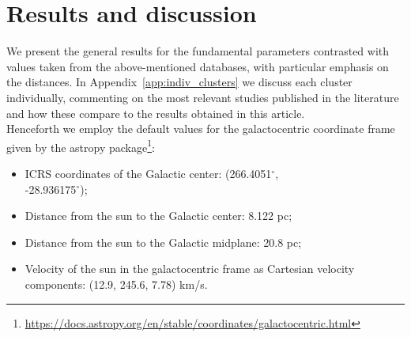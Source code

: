 \documentclass{aa}
\begin{document}
\section{Results and discussion}
 \label{sec:results}

 We present the general results for the
 fundamental parameters contrasted with values taken from the
 above-mentioned databases, with particular emphasis on the distances.
 In Appendix~\ref{app:indiv_clusters} we discuss each cluster
 individually, commenting on the most relevant studies published in the
 literature and how these compare to the results obtained in this article.\\

 Henceforth we employ the default values for the  galactocentric coordinate
 frame given by the astropy
 package\footnote{\url{https://docs.astropy.org/en/stable/coordinates/galactocentric.html}}:

 \begin{itemize}
  \item ICRS coordinates of the Galactic center: (266.4051$^{\circ}$,\\
  -28.936175$^{\circ}$);
  \item Distance from the sun to the Galactic center: 8.122 pc;
  \item Distance from the sun to the Galactic midplane: 20.8 pc;
  \item Velocity of the sun in the galactocentric frame as Cartesian velocity
  components: (12.9, 245.6, 7.78) km/s.
 \end{itemize}
\end{document}
